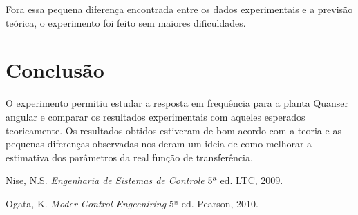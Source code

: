 \documentclass[journal]{IEEEtran}
\begin{document}
Fora essa pequena diferença encontrada entre os dados experimentais e 
a previsão teórica, o experimento foi feito sem maiores dificuldades.


\section{Conclusão}
O experimento permitiu estudar a  resposta em frequência para a 
planta Quanser angular e comparar os resultados experimentais
com aqueles esperados teoricamente. Os resultados obtidos
estiveram de bom acordo com a teoria e as pequenas diferenças
observadas nos deram um ideia de como melhorar a estimativa dos 
parâmetros da real função de transferência.
\begin{thebibliography}{9}    
      Nise, N.S.
      \emph{Engenharia de Sistemas de Controle}
     5ª ed.
    LTC, 2009.

      Ogata, K.
      \emph{Moder Control Engeeniring}
     5ª ed.
    Pearson, 2010.
   
\end{thebibliography}
\end{document}
